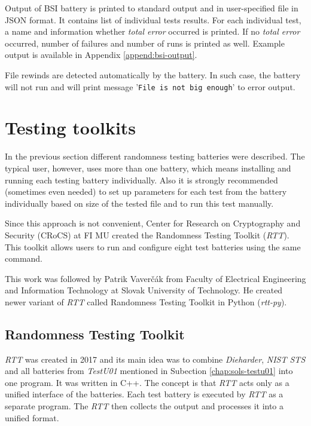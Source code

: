 \documentclass[
  digital,     %
  oneside,     %
  nosansbold,  %
  nocolorbold, %
  nolof,         %
  nolot,         %
]{fithesis4}
\begin{document}
Output of BSI battery is printed to standard output and in user-specified file in JSON format. It contains list of individual tests results. For each individual test, a name and information whether \emph{total error} occurred is printed. If no \emph{total error} occurred, number of failures and number of runs is printed as well. Example output is available in Appendix \ref{append:bsi-output}.

File rewinds are detected automatically by the battery. In such case, the battery will not run and will print message 
'\texttt{File is not big enough}' to error output.



\section{Testing toolkits}\label{chap:sols-toolkits}
In the previous section different randomness testing batteries were described. The typical user, however, uses more than one battery, which means installing and running each testing battery individually. Also it is strongly recommended (sometimes even needed) to set up parameters for each test from the battery individually based on size of the tested file and to run this test manually.

Since this approach is not convenient, Center for Research on Cryptography and Security (CRoCS) at FI MU created the Randomness Testing Toolkit (\emph{RTT}).\cite{obratil} This toolkit allows users to run and configure eight test batteries using the same command.

This work was followed by Patrik Vaverčák from Faculty of Electrical Engineering and Information Technology at Slovak University of Technology. He created newer variant of \emph{RTT} called Randomness Testing Toolkit in Python (\emph{rtt-py}). \cite{vavercak}

\subsection{Randomness Testing Toolkit} \label{chap:sols-rtt}

\emph{RTT} was created in 2017 and its main idea was to combine \emph{Dieharder}, \emph{NIST STS} and all batteries from \emph{TestU01} mentioned in Subection \ref{chap:sols-testu01} into one program. It was written in C++. The concept is that \emph{RTT} acts only as a unified interface of the batteries. Each test battery is executed by \emph{RTT} as a separate program. The \emph{RTT} then collects the output and processes it into a unified format.~\cite[p.~8]{rtt-obratil}
\end{document}
